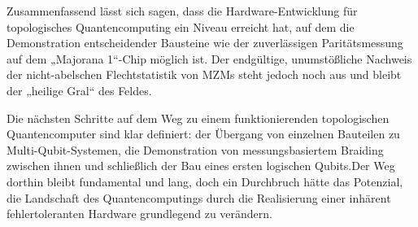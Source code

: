 Zusammenfassend lässt sich sagen, dass die Hardware-Entwicklung für topologisches Quantencomputing ein Niveau erreicht hat, auf dem die Demonstration entscheidender Bausteine wie der zuverlässigen Paritätsmessung auf dem „Majorana 1“-Chip möglich ist. Der endgültige, unumstößliche Nachweis der nicht-abelschen Flechtstatistik von MZMs steht jedoch noch aus und bleibt der „heilige Gral“ des Feldes.

Die nächsten Schritte auf dem Weg zu einem funktionierenden topologischen Quantencomputer sind klar definiert: der Übergang von einzelnen Bauteilen zu Multi-Qubit-Systemen, die Demonstration von messungsbasiertem Braiding zwischen ihnen und schließlich der Bau eines ersten logischen Qubits.Der Weg dorthin bleibt fundamental und lang, doch ein Durchbruch hätte das Potenzial, die Landschaft des Quantencomputings durch die Realisierung einer inhärent fehlertoleranten Hardware grundlegend zu verändern.
